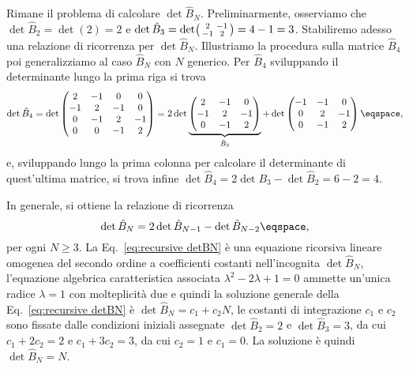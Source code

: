 Rimane il problema di calcolare $\det \hat{B}_{N}$.
Preliminarmente, osserviamo che $\det \hat{B}_{2} = \det (2)
= 2$ e $ \det \hat{B}_{3} = \det \begin{psmallmatrix} 2 & -1
\\ -1 & 2 \end{psmallmatrix} = 4 -1 = 3$.
Stabiliremo adesso una relazione di ricorrenza per $\det \hat{B}_{N}$.
Illustriamo la procedura sulla matrice $\hat{B}_{4}$ poi generalizziamo al caso
$\hat{B}_{N}$ con $N$ generico.
Per $\hat{B} _{4}$ sviluppando il determinante lungo la prima riga si trova 
\begin{displaymath}
\det \hat{B}_{4} =
\det \begin{pmatrix} 
2 & -1 & 0 & 0  \\
-1 & 2 & -1 & 0 \\
0 & -1 & 2 & -1 \\
0 & 0 & -1 & 2 
\end{pmatrix} = 
2 \det 
\underbrace{%
\begin{pmatrix} 
2 & -1 & 0 \\ 
-1 & 2 & -1 \\
0 & -1 & 2 
\end{pmatrix}
}_{\hat{B}_{3}}   + 
\det \begin{pmatrix} 
-1 & -1 & 0 \\
0 & 2 & -1 \\
0 & -1 & 2 
\end{pmatrix}  \eqspace, 
\end{displaymath}
e, sviluppando lungo la prima colonna per calcolare il determinante di
quest'ultima matrice, si trova infine $\det \hat{B}_{4}  = 2
\det{B}_{3} - \det \hat{B}_{2} = 6 -2 = 4$.

In generale, si ottiene la relazione di ricorrenza
\begin{equation}\label{eq:recursive detBN}
\det \hat{B}_{N} = 2 \det \hat{B}_{N-1} - \det \hat{B}_{N-2}  \eqspace ,
\end{equation}
per ogni $N\geq 3$.
La Eq.~\eqref{eq:recursive detBN}
\`e una equazione  ricorsiva lineare omogenea del secondo ordine a coefficienti
costanti nell'incognita
$\det \hat{B}_{N}$,  l'equazione algebrica caratteristica associata $\lambda^{2}
- 2\lambda +1 =0 $ ammette un'unica radice $\lambda =1$ con molteplicit\`a due e
quindi la soluzione generale della Eq.~\eqref{eq:recursive detBN} \`e $\det
\hat{B}_{N} = c_{1} +
c_{2} N$, le costanti di integrazione $c_{1}$ e $c_{2}$ sono fissate
dalle condizioni iniziali assegnate $\det \hat{B}_{2} = 2
$ e $\det\hat{B}_{3}=3$, da cui 
$c_{1} + 2 c_{2} = 2$ e $c_{1} + 3c_{2} = 3$, da cui $c_{2} = 1 $ e $c_{1} = 0
$. 
La soluzione \`e quindi $\det \hat{B}_{N} = N$.

